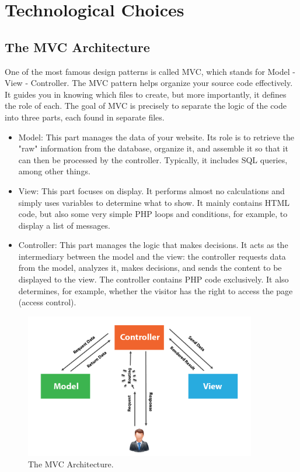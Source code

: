 \section{Technological Choices}
\subsection{The MVC Architecture}
One of the most famous design patterns is called MVC, which stands for Model - View - Controller.
The MVC pattern helps organize your source code effectively. It guides you in knowing which files to create, but more importantly, it defines the role of each. The goal of MVC is precisely to separate the logic of the code into three parts, each found in separate files.

\begin{itemize}
    \item Model: This part manages the data of your website. Its role is to retrieve the "raw" information from the database, organize it, and assemble it so that it can then be processed by the controller. Typically, it includes SQL queries, among other things.
    \item View: This part focuses on display. It performs almost no calculations and simply uses variables to determine what to show. It mainly contains HTML code, but also some very simple PHP loops and conditions, for example, to display a list of messages.
    \item Controller: This part manages the logic that makes decisions. It acts as the intermediary between the model and the view: the controller requests data from the model, analyzes it, makes decisions, and sends the content to be displayed to the view. The controller contains PHP code exclusively. It also determines, for example, whether the visitor has the right to access the page (access control).
\end{itemize}
 \begin{figure}[h]
    \centering
    \includegraphics[width=0.9\textwidth]{figures/mvc.png} 
    \caption{The MVC Architecture.}
\end{figure}\
\clearpage
